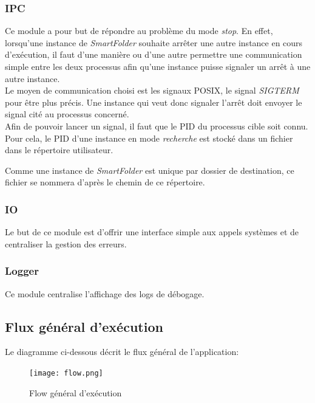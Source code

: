 \documentclass[11pt, a4paper]{article}
\begin{document}
\subsubsection{IPC}
\label{sec:ipc}
Ce module a pour but de répondre au problème du mode \textit{stop}.
En effet, lorsqu'une instance de \textit{SmartFolder} souhaite arrêter une autre instance en cours d'exécution,
il faut d'une manière ou d'une autre permettre une communication simple entre les deux processus afin
qu'une instance puisse signaler un arrêt à une autre instance. \\

Le moyen de communication choisi est les signaux POSIX, le signal \textit{SIGTERM} pour être plus précis.
Une instance qui veut donc signaler l'arrêt doit envoyer le signal cité au processus concerné. \\

Afin de pouvoir lancer un signal, il faut que le PID du processus cible soit connu.
Pour cela, le PID d'une instance en mode \textit{recherche} est stocké dans un fichier
dans le répertoire utilisateur.

Comme une instance de \textit{SmartFolder} est unique par dossier de destination,
ce fichier se nommera d'après le chemin de ce répertoire.

\subsubsection{IO}
Le but de ce module est d'offrir une interface simple aux appels systèmes et de centraliser la gestion des erreurs.

\subsubsection{Logger}
Ce module centralise l'affichage des logs de débogage.

\newpage

\subsection{Flux général d'exécution}

Le diagramme ci-dessous décrit le flux général de l'application:

\begin{figure}[H]
    \begin{center}
        \texttt{[image: flow.png]}
    \end{center}
    \caption{Flow général d'exécution}
    \label{Flow général d'exécution}
\end{figure}
\end{document}
